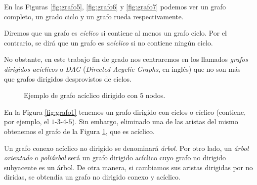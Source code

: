 \begin{exampleth}
En las Figuras \ref{fig:grafo5}, \ref{fig:grafo6} y \ref{fig:grafo7} podemos ver un grafo completo, un grado ciclo y un grafo rueda respectivamente.
\end{exampleth}

\begin{definition}
Diremos que un grafo es \emph{cíclico} si contiene al menos un grafo ciclo. Por el contrario, se dirá que un grafo es \emph{acíclico} si no contiene ningún ciclo.

No obstante, en este trabajo fin de grado nos centraremos en los llamados \emph{grafos dirigidos acíclicos} o \emph{DAG} (\emph{Directed Acyclic Graphs}, en inglés) que no son más que grafos dirigidos desprovistos de ciclos.
\end{definition}

\begin{figure}[H]
\centering
{}
\caption{Ejemplo de grafo acíclico dirigido con $5$ nodos.}
\label{fig:grafo8}
\end{figure}

\begin{exampleth}
En la Figura \ref{fig:grafo1} tenemos un grafo dirigido con ciclos o cíclico (contiene, por ejemplo, el $1$-$3$-$4$-$5$). Sin embargo, eliminado una de las aristas del mismo obtenemos el grafo de la Figura \ref{fig:grafo8}, que es acíclico. 
\end{exampleth}

\begin{definition}
Un grafo conexo acíclico no dirigido se denominará \emph{árbol}. Por otro lado, un \emph{árbol orientado} o \emph{poliárbol} será un grafo dirigido acíclico cuyo grafo no dirigido subyacente es un árbol. De otra manera, si cambiamos sus aristas dirigidas por no diridas, se obtendía un grafo no dirigido conexo y acíclico.
\end{definition}

